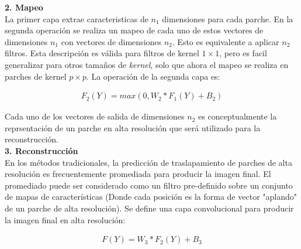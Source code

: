 \textbf{2. Mapeo}\\
La primer capa extrae caracteristicas de $n_1$ dimensiones para cada parche. En la segunda operación se realiza un mapeo de cada
uno de estos vectores de dimensiones $n_1$ con vectores de dimensiones $n_2$. Esto es equivalente a aplicar $n_2$ filtros. Esta
descripción es válida para filtros de kernel $1\times1$, pero es facil generalizar para otros tamaños de \emph{kernel}, solo que
ahora el mapeo se realiza en parches de kernel $p\times p$. La operación de la segunda capa es:

\begin{align}
    \label{eqn:SRCNN_SecondLayer}
    F_2(Y)=max(0,W_2*F_1(Y)+B_2)
\end{align}

Cada uno de los vectores de salida de dimensiones $n_2$ es conceptualmente la reprsentación de un parche en alta resolución que
será utilizado para la reconstrucción.\\

\textbf{3. Reconstrucción}\\
En los métodos tradicionales, la predicción de traslapamiento de parches de alta resolución es frecuentemente promediada para
producir la imagen final. El promediado puede ser considerado como un filtro pre-definido sobre un conjunto de mapas de
características (Donde cada posición es la forma de vector "aplando" de un parche de alta resolución). Se define una capa
convolucional para producir la imagen final en alta resolución:

\begin{align}
    \label{eqn:SRCNN_ThirdLayer}
    F(Y)=W_3*F_2(Y)+B_3
\end{align}